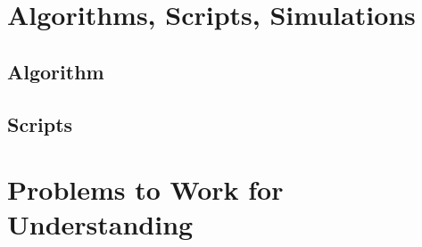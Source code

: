\documentclass[12pt]{article}
\begin{document}
\section*{Algorithms, Scripts, Simulations}

\subsection*{Algorithm}

\subsection*{Scripts}

% 

\hr

\section*{Problems to Work for Understanding}

\renewcommand{\theexerciseseries}{}
\renewcommand{\theexercise}{\arabic{exercise}}
\end{document}
